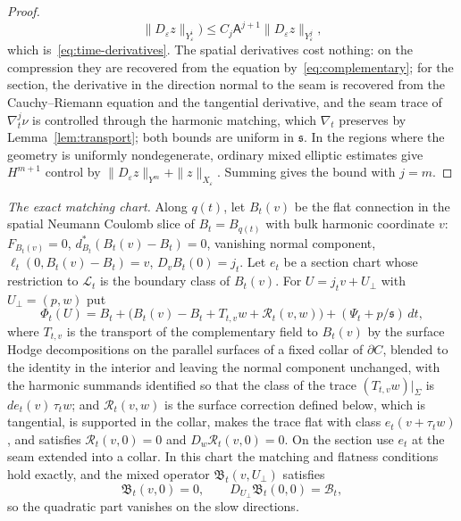 \documentclass[11pt]{amsart}
\theoremstyle{definition}
\theoremstyle{remark}
\theoremstyle{plain}
\numberwithin{equation}{section}
\newcommand{\eps}{\varepsilon}
\begin{document}
\begin{proof}
\[\|D_\eps z\|_{Y^i_\eps}\Bigr)\le C_j\mathsf A^{j+1}\|D_\eps z\|_{Y^j_\eps},
\]
which is~\eqref{eq:time-derivatives}. The spatial derivatives cost nothing: on the
compression they are recovered from the equation by~\eqref{eq:complementary}; for
the section, the derivative in the direction normal to the seam is recovered
from the Cauchy--Riemann equation and the tangential derivative, and the seam
trace of $\nabla_t^j\nu$ is controlled through the harmonic matching, which
$\nabla_t$ preserves by Lemma~\ref{lem:transport}; both bounds are uniform in
${\mathfrak s}$. In the regions where the geometry is uniformly nondegenerate, ordinary
mixed elliptic estimates give $H^{m+1}$ control by $\|D_\eps z\|_{Y^m}+\|z\|_{X_\eps}$.
Summing gives the bound with $j=m$.
\end{proof}

\emph{The exact matching chart.} Along $q(t)$, let $B_t(v)$ be the flat
connection in the spatial Neumann Coulomb slice of $B_t=B_{q(t)}$ with bulk
harmonic coordinate $v$: $F_{B_t(v)}=0$, $d^*_{B_t}(B_t(v)-B_t)=0$, vanishing normal
component, $\ell_t(0,B_t(v)-B_t)=v$, $D_vB_t(0)=j_t$. Let $e_t$ be a section chart
whose restriction to $\mathscr L_t$ is the boundary class of $B_t(v)$. For
$U=j_tv+U_\perp$ with $U_\perp=(p,w)$ put
\[
\Phi_t(U)=B_t+\bigl(B_t(v)-B_t+T_{t,v}w+\mathcal R_t(v,w)\bigr)+(\Psi_t+p/{\mathfrak s})\,dt,
\]
where $T_{t,v}$ is the transport of the complementary field to $B_t(v)$ by the surface Hodge
decompositions on the parallel surfaces of a fixed collar of $\partial C$, blended to the
identity in the interior and leaving the normal component unchanged, with the harmonic summands
identified so that the class of the trace $(T_{t,v}w)|_\Sigma$ is $de_t(v)\,\tau_tw$; and
$\mathcal R_t(v,w)$ is the surface correction defined below, which is tangential, is supported in
the collar, makes the trace flat with class $e_t(v+\tau_tw)$, and satisfies $\mathcal R_t(v,0)=0$
and $D_w\mathcal R_t(v,0)=0$. On the section use $e_t$ at the seam extended into a
collar. In this chart the matching and flatness conditions hold exactly, and
the mixed operator $\mathfrak B_t(v,U_\perp)$ satisfies
\begin{equation}\label{eq:exact-chart}
\mathfrak B_t(v,0)=0,\qquad D_{U_\perp}\mathfrak B_t(0,0)=\mathcal B_t ,
\end{equation}
so the quadratic part vanishes on the slow directions.
\end{document}
